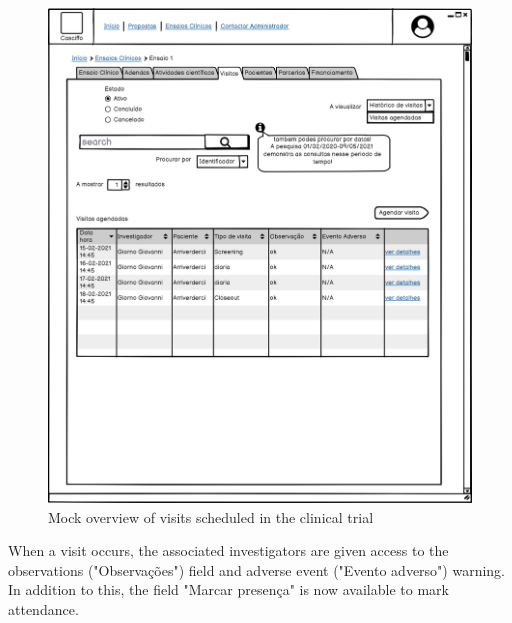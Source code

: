 \begin{figure}
    \centering
    \includegraphics{images/ensaio-visitas.png}
    \caption{Mock overview of visits scheduled in the clinical trial}
    \label{fig:ensaio-visitas}
\end{figure}

When a visit occurs, the associated investigators are given access to the observations ("Observações") field and adverse event ("Evento adverso") warning. In addition to this, the field "Marcar presença" is now available to mark attendance.